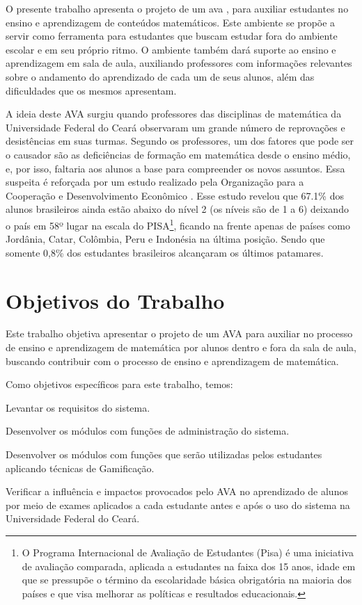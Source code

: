 O presente trabalho apresenta o projeto de um \gls{ava} \cite{valentini2010aprendizagem}, para auxiliar 
estudantes no ensino e aprendizagem de conteúdos matemáticos. Este ambiente se propõe a servir como ferramenta para estudantes que buscam 
estudar fora do ambiente escolar e em seu próprio ritmo. O ambiente também dará suporte ao ensino e aprendizagem em sala de aula, 
auxiliando professores com informações relevantes sobre o andamento do aprendizado de cada um de seus alunos, além das dificuldades que os 
mesmos apresentam.

A ideia deste AVA surgiu quando professores das disciplinas de matemática da Universidade Federal do Cear\'a observaram um grande número de 
reprovações e desistências em suas turmas. Segundo os professores, um dos fatores que pode ser o causador são as deficiências de formação em 
matemática desde o ensino médio, e, por isso, faltaria aos alunos a base para compreender os novos assuntos. Essa suspeita é reforçada por 
um estudo realizado pela Organização para a Cooperação e Desenvolvimento Econômico \cite{pisainfocus2016}. Esse estudo revelou que 67.1\% 
dos alunos brasileiros ainda estão abaixo do nível 2 (os níveis são de 1 a 6) deixando o país em 58º lugar na escala do PISA\footnote{O 
Programa Internacional de Avaliação de Estudantes (Pisa) é uma iniciativa de avaliação comparada, aplicada a estudantes na faixa dos 15 
anos, idade em que se pressupõe o término da escolaridade básica obrigatória na maioria dos países e que visa melhorar as políticas e 
resultados educacionais.}, ficando na frente apenas de países como Jordânia, Catar, Colômbia, Peru e Indonésia na \'ultima posi\c{c}\~ao. 
Sendo 
que somente 0,8\% dos estudantes brasileiros alcançaram os últimos patamares.

\section{Objetivos do Trabalho}

Este trabalho objetiva apresentar o projeto de um AVA para auxiliar no processo de ensino e aprendizagem de matemática por alunos dentro e 
fora da sala de aula, buscando contribuir com o processo de ensino e aprendizagem de matem\'atica. 

Como objetivos específicos para este trabalho, temos: 
\begin{alineas}
  \item Levantar os requisitos do sistema.
  \item Desenvolver os módulos com funções de administração do sistema.
  \item Desenvolver os módulos com funções que serão utilizadas pelos estudantes aplicando técnicas de Gamificação.
  \item Verificar a influência e impactos provocados pelo AVA no aprendizado de alunos por meio de exames aplicados a 
cada estudante antes e após o uso do sistema na Universidade Federal do Ceará.
\end{alineas}


